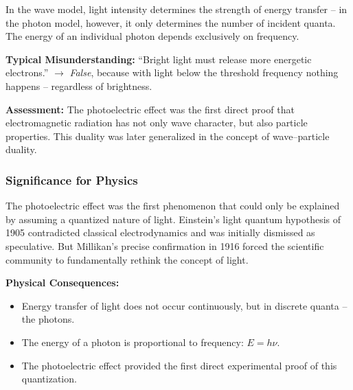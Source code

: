 \vspace{1em}

\begin{tcolorbox}[didaktikbox, title=Didactic Clarification]
	\label{box:didaktischeKlarstellung}
	\small
	In the wave model, light intensity determines the strength of energy transfer – in the photon model, however, it only determines the number of incident quanta.\\
	The energy of an individual photon depends exclusively on frequency.
\end{tcolorbox}
\vspace{1em}

\textbf{Typical Misunderstanding:}  
“Bright light must release more energetic electrons.”  
$\rightarrow$ \emph{False}, because with light below the threshold frequency nothing happens – regardless of brightness.

\textbf{Assessment:}  
The photoelectric effect was the first direct proof that electromagnetic radiation has not only wave character, but also particle properties. This duality was later generalized in the concept of wave–particle duality.

\subsubsection{Significance for Physics}

The photoelectric effect was the first phenomenon that could only be explained by assuming a quantized nature of light. Einstein’s light quantum hypothesis of 1905 contradicted classical electrodynamics and was initially dismissed as speculative. But Millikan’s precise confirmation in 1916 forced the scientific community to fundamentally rethink the concept of light.

\textbf{Physical Consequences:}
\begin{itemize}
	\item Energy transfer of light does not occur continuously, but in discrete quanta – the photons.
	\item The energy of a photon is proportional to frequency: \( E = h\nu \).
	\item The photoelectric effect provided the first direct experimental proof of this quantization.
\end{itemize}


